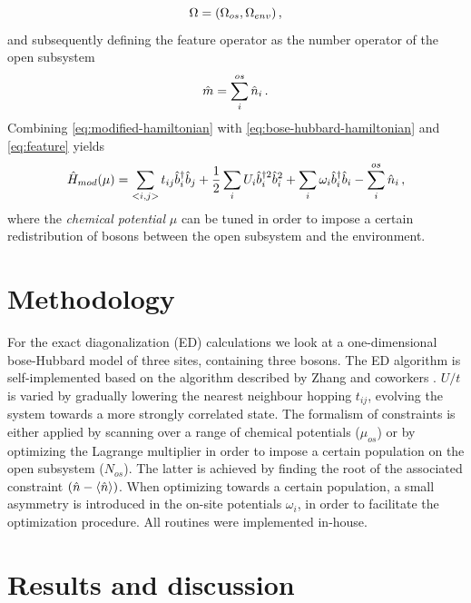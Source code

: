 \documentclass[twoside,twocolumn,9pt]{article}
\begin{document}
\begin{equation}
  \Omega = (\Omega_{os}, \Omega_{env}) \thinspace ,
\end{equation} 
and subsequently defining the feature operator as the number operator of the open subsystem
\begin{equation}
  \hat{m} = \sum_i^{os}\hat{n}_i \thinspace .
  \label{eq:feature}
\end{equation}
Combining \ref{eq:modified-hamiltonian} with \ref{eq:bose-hubbard-hamiltonian} and \ref{eq:feature} yields
\begin{equation}
  \hat{H}_{mod}(\mu) = \sum_{<i,j>} t_{ij}\hat{b}_i^\dagger \hat{b}_j + \frac{1}{2}\sum_i U_i\hat{b}_i^{\dagger 2} \hat{b}_i^{2} + \sum_i \omega_i \hat{b}_i^\dagger \hat{b}_i - \sum_i^{os}\hat{n}_i \thinspace ,
\end{equation}
where the \emph{chemical potential} $\mu$ can be tuned in order to impose a certain redistribution of bosons between the open subsystem and the environment.

\section{Methodology}

For the exact diagonalization (ED) calculations we look at a one-dimensional bose-Hubbard model of three sites, containing three bosons. The ED algorithm is self-implemented based on the algorithm described by Zhang and coworkers \cite{zhang2010}. $U/t$ is varied by gradually lowering the nearest neighbour hopping $t_{ij}$, evolving the system towards a more strongly correlated state. The formalism of constraints is either applied by scanning over a range of chemical potentials ($\mu_{os}$) or by optimizing the Lagrange multiplier in order to impose a certain population on the open subsystem ($N_{os}$). The latter is achieved by finding the root of the associated constraint $(\hat{n} - \expval{\hat{n}})$. When optimizing towards a certain population, a small asymmetry is introduced in the on-site potentials $\omega_i$, in order to facilitate the optimization procedure. All routines were implemented in-house. 

\section{Results and discussion}
\end{document}
